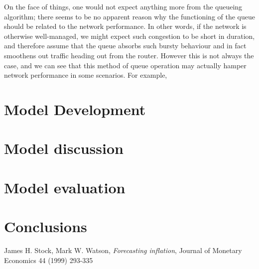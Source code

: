 \documentclass[paper=letter, fontsize=13pt]{article}
\begin{document}
On the face of things, one would not expect anything more from the queueing algorithm; there seems to be no apparent reason why the functioning of the queue should be related to the network performance. In other words, if the network is otherwise well-managed, we might expect such congestion to be short in duration, and therefore assume that the queue absorbs such bursty behaviour and in fact smoothens out traffic heading out from the router. However this is not always the case, and we can see that this method of queue operation may actually hamper network performance in some scenarios. For example, 

\section{Model Development}



\section{Model discussion}


\section{Model evaluation}



\section{Conclusions}




\begin{thebibliography}{99}
James H. Stock, Mark  W. Watson, \textit{Forecasting inflation}, Journal of Monetary Economics 44 (1999) 293-335

\end{thebibliography}


\end{document}
